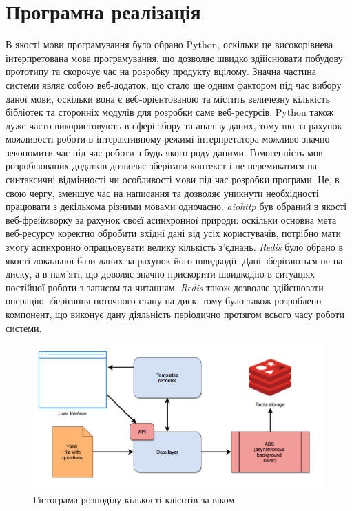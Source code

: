 \section{Програмна реалізація}
В якості мови програмування було обрано Python, оскільки це високорівнева інтерпретована мова програмування, що дозволяє швидко здійснювати побудову прототипу та скорочує час на розробку продукту вцілому. Значна частина системи являє собою веб-додаток, що стало ще одним фактором під час вибору даної мови, оскільки вона є веб-орієнтованою та містить величезну кількість бібліотек та сторонніх модулів для розробки саме веб-ресурсів. Python також дуже часто використовують в сфері збору та аналізу даних, тому що за рахунок можливості роботи в інтерактивному режимі інтерпретатора можливо значно зекономити час під час роботи з будь-якого роду даними. Гомогенність мов розроблюваних додатків дозволяє зберігати контекст і не перемикатися на синтаксичні відмінності чи особливості мови під час розробки програми. Це, в свою чергу, зменшує час на написання та дозволяє уникнути необхідності працювати з декількома різними мовами одночасно.
\textit{aiohttp} був обраний в якості веб-фреймворку за рахунок своєї асинхронної природи: оскільки основна мета веб-ресурсу коректно обробити вхідні дані від усіх користувачів, потрібно мати змогу асинхронно опрацьовувати велику кількість з'єднань. \textit{Redis} було обрано в якості локальної бази даних за рахунок його швидкодії. Дані зберігаються не на диску, а в пам'яті, що доволяє значно прискорити швидкодію в ситуаціях постійної роботи з записом та читанням. \textit{Redis} також дозволяє здійснювати операцію зберігання поточного стану на диск, тому було також розроблено компонент, що виконує дану діяльність періодично протягом всього часу роботи системи.

\begin{figure}[h!]
  \includegraphics[width=\linewidth]{figures/poll_framework_architecture.png}
  \caption{Гістограма розподілу кількості клієнтів за віком}
  \label{fig:poll_framework_architecture}
\end{figure}


